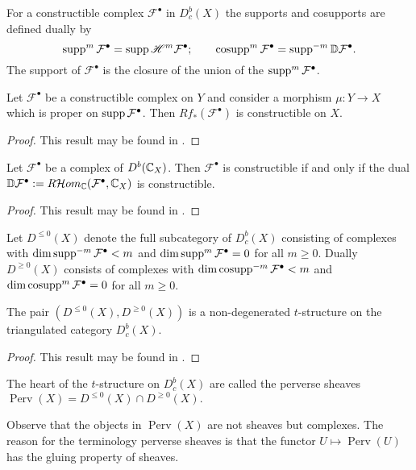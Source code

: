   For a constructible complex $\mathcal{F}^\bullet$ in $D^b_c(X)$ the supports and cosupports are defined dually by
  $$\operatorname{supp}^m\mathcal{F}^\bullet = \operatorname{supp} \mathscr{H}^m \mathcal{F}^\bullet; \qquad \operatorname{cosupp}^m\mathcal{F}^\bullet = \operatorname{supp}^{-m}\mathbb{D}\mathcal{F}^\bullet.$$
  The support of $\mathcal{F}^\bullet$ is the closure of the union of the $\operatorname{supp}^m\mathcal{F}^\bullet$.
  \begin{theorem}
    Let $\mathcal{F}^\bullet$ be a constructible complex on $Y$ and consider a morphism $\mu:Y\to X$ which is proper on $\operatorname{supp} \mathcal{F}^\bullet$. Then $Rf_*(\mathcal{F}^\bullet)$ is constructible on $X$.
  \end{theorem}
  \begin{proof}
    This result may be found in \cite[Chapter 4]{dimca2004sheaves}.
  \end{proof}
  \begin{theorem}
    Let $\mathcal{F}^\bullet$ be a complex of $D^b(\mathbb{C}_X)$. Then $\mathcal{F}^\bullet$ is constructible if and only if the dual $\mathbb{D}\mathcal{F}^\bullet := R \mathcal{H}om_{\mathbb{C}}(\mathcal{F}^\bullet,\mathbb{C}_X)$ is constructible.
  \end{theorem}
  \begin{proof}
    This result may be found in \cite[Chapter 4]{dimca2004sheaves}.
  \end{proof}
  Let $D^{\leq 0}(X)$ denote the full subcategory of $D^b_c(X)$ consisting of complexes with $\dim \operatorname{supp}^{-m} \mathcal{F}^\bullet < m$ and $\dim \operatorname{supp}^m \mathcal{F}^\bullet = 0$ for all $m\geq 0$.
  Dually $D^{\geq 0}(X)$ consists of complexes with $\dim \operatorname{cosupp}^{-m}\mathcal{F}^\bullet <m$ and $\dim \operatorname{cosupp}^m \mathcal{F}^\bullet = 0$ for all $m\geq 0$.
  \begin{proposition}
    The pair $(D^{\leq 0}(X), D^{\geq 0}(X))$ is a non-degenerated $t$-structure on the triangulated category $D^{b}_c(X)$.
  \end{proposition}
  \begin{proof}
    This result may be found in \cite[Chapter 5]{dimca2004sheaves}.
  \end{proof}
  \begin{definition}
    The heart of the $t$-structure on $D^b_c(X)$ are called the perverse sheaves $\operatorname{Perv}(X) = D^{\leq 0}(X)\cap D^{\geq 0}(X).$
  \end{definition}
  Observe that the objects in $\operatorname{Perv}(X)$ are not sheaves but complexes.
  The reason for the terminology perverse sheaves is that the functor $U\mapsto \operatorname{Perv}(U)$ has the gluing property of sheaves.

